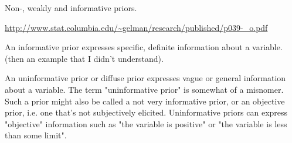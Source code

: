  
Non-, weakly and informative priors. 

\url{http://www.stat.columbia.edu/~gelman/research/published/p039-_o.pdf}

An informative prior expresses specific, definite information about a variable. (then an example that I didn't understand).

An uninformative prior or diffuse prior expresses vague or general information about a variable. The term "uninformative prior" is somewhat of a misnomer. Such a prior might also be called a not very informative prior, or an objective prior, i.e. one that's not subjectively elicited. Uninformative priors can express "objective" information such as "the variable is positive" or "the variable is less than some limit".




